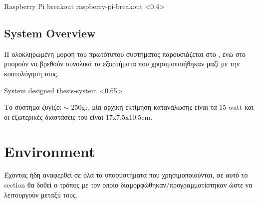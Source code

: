 %
{Raspberry Pi breakout}%
{raspberry-pi-breakout}%
<0.4>


\subsection{System Overview}
Η ολοκληρωμένη μορφή του πρωτότυπου συστήματος παρουσιάζεται στο , ενώ στο  μπορούν να βρεθούν συνολικά τα εξαρτήματα που χρησιμοποιήθηκαν μαζί με την κοστολόγηση τους. 

{System designed}%
{thesis-system}%
<0.65>

Το σύστημα ζυγίζει $\sim$ 250gr, μία αρχική εκτίμηση κατανάλωσης είναι τα 15 watt και οι εξωτερικές διαστάσεις του είναι 17x7.5x10.5cm.

\begin{table}[H]
    \caption[]{Bill of Materials}
    \label{tab:thesis-system-bom}
    \centering
  \end{table}


\section{Environment}
Έχοντας ήδη αναφερθεί σε όλα τα υποσυστήματα που χρησιμοποιούνται, σε αυτό το section θα δοθεί ο τρόπος με τον οποίο διαμορφώθηκαν/προγραμματίστηκαν ώστε να λειτουργούν μεταξύ τους.

